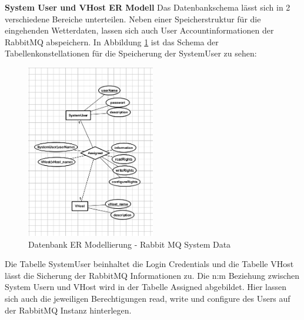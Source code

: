\textbf{System User und VHost ER Modell}
Das Datenbankschema lässt sich in 2 verschiedene Bereiche unterteilen. Neben einer Speicherstruktur für die eingehenden Wetterdaten, lassen sich auch User Accountinformationen der RabbitMQ abspeichern. In Abbildung \ref{img:DBSchemaSystemUser} ist das Schema der Tabellenkonstellationen für die Speicherung der SystemUser zu sehen: 
\begin{figure}[htbp]
	\centering
	\includegraphics[width=0.5\textwidth]{Bilder/DBSchemaSystemUser.png}
	\caption{Datenbank ER Modellierung - Rabbit MQ System Data}
	\label{img:DBSchemaSystemUser}
\end{figure} 
Die Tabelle SystemUser  beinhaltet die Login Credentials und die Tabelle VHost lässt die Sicherung der RabbitMQ Informationen zu. 
Die n:m Beziehung zwischen System Usern und VHost wird in der Tabelle Assigned abgebildet. Hier lassen sich auch die jeweiligen Berechtigungen read, write und configure des Users auf der RabbitMQ Instanz hinterlegen.

